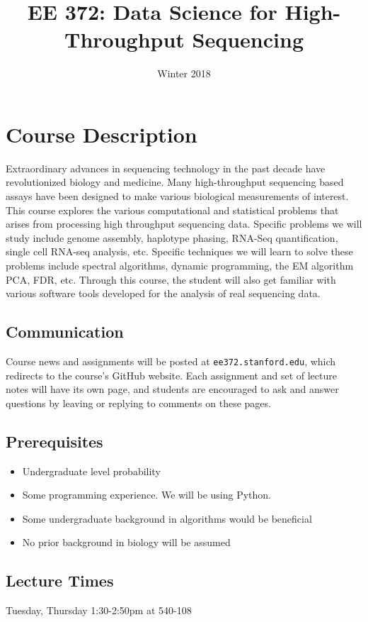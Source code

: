 \documentclass[11pt,onecolumn]{article}
\title{EE 372: Data Science for High-Throughput Sequencing}
\author{Winter 2018}
\date{\vspace{-5ex}}
\begin{document}
\maketitle

\section*{Course Description}
Extraordinary advances in sequencing technology in the past decade have revolutionized biology and medicine. Many high-throughput sequencing based assays have been designed to make various biological measurements of interest. This course explores the various computational and statistical problems that arises from processing high throughput sequencing data. Specific problems we will study include genome assembly, haplotype phasing, RNA-Seq quantification, single cell RNA-seq analysis, etc.  Specific techniques we will learn to solve these problems include spectral algorithms, dynamic programming, the EM algorithm PCA, FDR, etc. Through this course, the student will also get familiar with various software tools developed for the analysis of real sequencing data.

\subsection*{Communication}
Course news and assignments will be posted at \texttt{ee372.stanford.edu}, which redirects to the course's GitHub website. Each assignment and set of lecture notes will have its own page, and students are encouraged to ask and answer questions by leaving or replying to comments on these pages.

\subsection*{Prerequisites}
\begin{itemize}
	\itemsep0em 
	\item Undergraduate level probability
	\item Some programming experience. We will be using Python.
	\item Some undergraduate background in algorithms would be beneficial
	\item No prior background in biology will be assumed
\end{itemize}

\subsection*{Lecture Times}
Tuesday, Thursday 1:30-2:50pm at 540-108 \\
\end{document}
